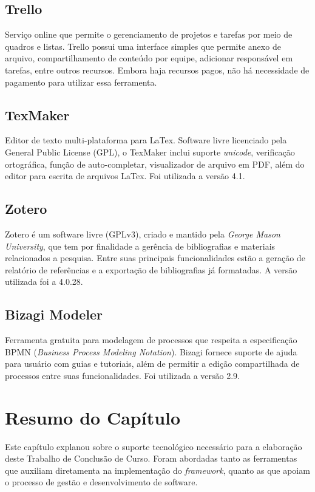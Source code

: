 \subsection{Trello} 
Serviço online que permite o gerenciamento de projetos e tarefas por meio de quadros e listas. Trello possui uma interface simples que permite anexo de arquivo, compartilhamento de conteúdo por equipe, adicionar responsável em tarefas,  entre outros recursos. Embora haja recursos pagos, não há necessidade de pagamento para utilizar essa ferramenta.

\subsection{TexMaker}
Editor de texto multi-plataforma para LaTex. Software livre licenciado pela General Public License (GPL), o TexMaker inclui suporte \textit{unicode}, verificação ortográfica, função de auto-completar, visualizador de arquivo em PDF, além do editor para escrita de arquivos LaTex. Foi utilizada a versão 4.1.

\subsection{Zotero}
Zotero é um software livre (GPLv3), criado e mantido pela \textit{George Mason University}, que tem por finalidade a gerência de bibliografias e materiais relacionados a pesquisa. Entre suas principais funcionalidades estão a geração de relatório de referências e a exportação de bibliografias já formatadas. A versão utilizada foi a 4.0.28.

\subsection{Bizagi Modeler}
Ferramenta gratuita para modelagem de processos que respeita a especificação BPMN (\textit{Business Process Modeling Notation}). Bizagi fornece suporte de ajuda para usuário com guias e tutoriais, além de permitir a edição compartilhada de processos entre suas funcionalidades. Foi utilizada a versão 2.9.

\section{Resumo do Capítulo}
Este capítulo explanou sobre o suporte tecnológico necessário para a elaboração deste Trabalho de Conclusão de Curso. Foram abordadas tanto as ferramentas que auxiliam diretamenta na implementação do \textit{framework}, quanto as que apoiam o processo de gestão e desenvolvimento de software.
